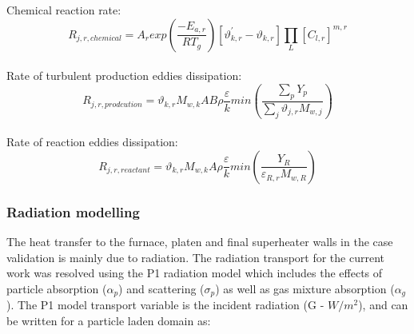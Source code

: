 \documentclass{webofc}
\begin{document}
Chemical reaction rate:
\begin{equation}\label{eqn_rate_chemical}
R_{j,r,chemical}=A_{r}exp\left(\frac{-E_{a,r}}{RT_g}\right)\left[\vartheta^{'}_{k,r}-\vartheta_{k,r}\right]\prod_{L}\left[C_{l,r}\right]^{m,r}
\end{equation}\\
Rate of turbulent production eddies dissipation:
\begin{equation}\label{eqn_rate_products}
R_{j,r,prodcution}=\vartheta_{k,r}M_{w,k}AB\rho\frac{\varepsilon}{k}min\left(\frac{\sum_{p} Y_p}{\sum_{j}\vartheta_{j,r}M_{w,j}}\right)
\end{equation}\\
Rate of reaction eddies dissipation:
\begin{equation}\label{eqn_rate_reactants}
R_{j,r,reactant}=\vartheta_{k,r}M_{w,k}A\rho\frac{\varepsilon}{k}min\left(\frac{Y_R}{\varepsilon_{R,r}M_{w,R}}\right)
\end{equation}

\subsubsection{Radiation modelling}

The heat transfer to the furnace, platen and final superheater walls in the case validation is mainly due to radiation. The radiation transport for the current work was resolved using the P1 radiation model which includes the effects of particle absorption ($\alpha_p$) and scattering ($\sigma_p$) as well as gas mixture absorption ($\alpha_g$). The P1 model transport variable is the incident radiation (G - $W/m^2$), and can be written for a particle laden domain as:
\end{document}
